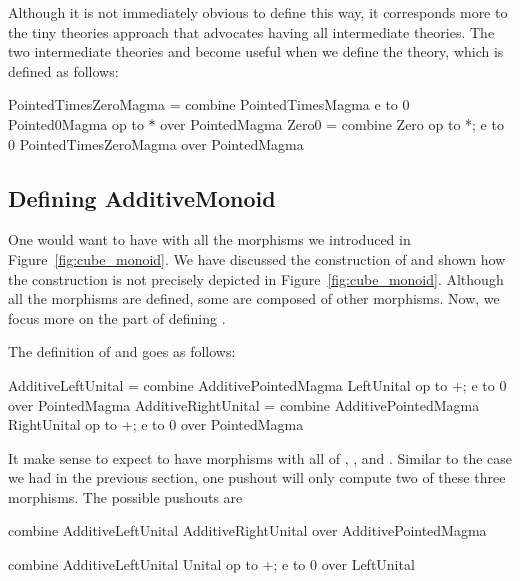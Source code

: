 Although it is not immediately obvious to define  this way, it corresponds more to the tiny theories approach that advocates having all intermediate theories. The two intermediate theories  and  become useful when we define the  theory, which is defined as follows:  
\begin{togcode}
PointedTimesZeroMagma = 
  combine PointedTimesMagma {e to 0} Pointed0Magma {op to *}
  over PointedMagma 
Zero0 = 
  combine Zero {op to *; e to 0} PointedTimesZeroMagma {} 
  over PointedMagma 
\end{togcode}

\subsection{Defining AdditiveMonoid}
One would want to have  with all the morphisms we introduced in Figure~\ref{fig:cube_monoid}. %
We have discussed the construction of  and shown how the construction is not precisely depicted in Figure~\ref{fig:cube_monoid}. Although all the morphisms are defined, some are composed of other morphisms. Now, we focus more on the part of defining . 

\noindent The definition of  and  goes as follows: 
\begin{togcode}
AdditiveLeftUnital = 
  combine AdditivePointedMagma {} LeftUnital {op to +; e to 0} 
  over PointedMagma
AdditiveRightUnital = 
  combine AdditivePointedMagma {} RightUnital {op to +; e to 0} 
  over PointedMagma
\end{togcode} 
\noindent It make sense to expect  to have morphisms with all of , , and . Similar to the case we had in the previous section, one pushout will only compute two of these three morphisms. The possible pushouts are 
\begin{togcode}
combine AdditiveLeftUnital {} AdditiveRightUnital {} 
over AdditivePointedMagma
\end{togcode}

\begin{togcode}
combine AdditiveLeftUnital {} Unital {op to +; e to 0} 
over LeftUnital 
\end{togcode}

